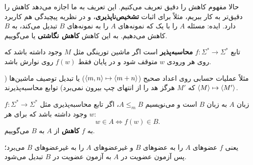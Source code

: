 حالا مفهوم کاهش را دقیق تعریف می‌کنیم. این تعریف به ما اجازه می‌دهد کاهش را دقیق‌تر به کار ببریم، مثلاً برای اثبات \textbf{تشخیص‌ناپذیری}، و در نظریه پیچیدگی هم کاربرد دارد. ایده: مسئله $A$ را با یک  که نمونه‌های $A$ را به نمونه‌های $B$ تبدیل می‌کند، به $B$ کاهش می‌دهیم. به این کاهش \textbf{کاهش نگاشتی} یا  می‌گوییم.

\begin{definition}
تابع $f:\Sigma^*\to\Sigma^*$ \textbf{محاسبه‌پذیر} است اگر ماشین تورینگی مثل $M$ وجود داشته باشد که روی هر ورودی $w$ متوقف شود و در پایان فقط $f(w)$ روی نوارش باشد.
\end{definition}

مثلاً عملیات حسابی روی اعداد صحیح ($\langle m,n\rangle\mapsto\langle m+n\rangle$) یا تبدیل توصیف ماشین‌ها ($\langle M\rangle\mapsto\langle M'\rangle$ که $M'$ هرگز هد را از انتهای چپ بیرون نمی‌برد) توابع محاسبه‌پذیرند.

\begin{definition}
زبان $A$ به زبان $B$  است و می‌نویسیم $A\le_m B$، اگر تابع محاسبه‌پذیری مثل $f:\Sigma^*\to\Sigma^*$ وجود داشته باشد که برای هر $w$:
\[w\in A\iff f(w)\in B.\]
به $f$ \textbf{کاهش} از $A$ به $B$ می‌گوییم.
\end{definition}

\begin{ltrfig}
\end{ltrfig}
یعنی $f$ عضوهای $A$ را به عضوهای $B$ و غیرعضوهای $A$ را به غیرعضوهای $B$ می‌برد؛ پس آزمون عضویت در $A$ به آزمون عضویت در $B$ تبدیل می‌شود.


